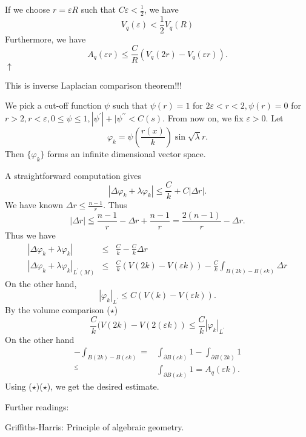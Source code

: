 If we choose $ r = \varepsilon R $ such that $ C \varepsilon < \frac{1}{2}$, we have 
%
\[ V_q (\varepsilon ) < \frac{1}{2} V_q (R) \]
Furthermore, we have 
%
\begin{equation}
A_q (\varepsilon r) \leq \frac{C}{R} (V_q (2r) - V_q (\varepsilon r)). \tag{$\star \star$} \end{equation}
\hspace{1.9in} $\uparrow$  \hfill 

%
This is inverse Laplacian comparison theorem!!!

We pick a cut-off function $ \psi $ such that $ \psi (r) = 1 $ for $ 2 \varepsilon < r < 2 , \psi (r) = 0 $ for $ r > 2 , r < \varepsilon , 0 \leq \psi \leq 1, |\psi ^\prime |+| \psi ^{\prime \prime } < C(s) $. From now on, we fix $ \varepsilon > 0 $. Let 
%
\[ \varphi _k = \psi \left( \frac{r(x)}{k} \right) \sin \sqrt{\lambda} r.\]
%
Then $ \{ \varphi _k\}$ forms an infinite dimensional vector space. 

A straightforward computation gives 
%
\[ |\Delta \varphi _k + \lambda \varphi_k |\leq \frac{C}{k} + C | \Delta r|.\]
%
We have known $ \Delta r \leq \frac{n-1}{r} $. Thus 
%
\[|\Delta r| \leqq \frac{n-1}{r} - \Delta r + \frac{n-1}{r} = \frac{2(n-1)}{r} - \Delta r .\]
Thus we have 
%
\begin{eqnarray*}  |\Delta \varphi _k + \lambda \varphi _k |&\leq& \frac{C}{k} - \frac{C}{k} \Delta r \\
|\Delta \varphi _k + \lambda \varphi _k |_{L^\prime (M)}&\leq& \frac{C}{k}   (V (2k) - V ( \varepsilon k)) - \frac{C}{k} \int_{B(2k) - B (\varepsilon k) }\Delta r \end{eqnarray*}
%
On the other hand, 
%
\[ | \varphi _k |_{L^{\prime}} \leq C ( V(k) - V ( \varepsilon k)) . \]
%
By the volume comparison ($\star$) 
%
\[ \frac{C}{k}( V(2k) - V (2 (\varepsilon k)) \leq \frac{C}{k}|\varphi _k |_{L^{\prime}}\]
On the other hand 
\begin{eqnarray*}
- \int_{B(2k) - B (\varepsilon k) }  = & \int_{\partial B(\varepsilon k)  } 1 - \int_{\partial B(2k)   } 1 \\
^ \leq & \int_{\partial B(\varepsilon k) } 1 = A_q (\varepsilon k) .
\end{eqnarray*}
Using ($\star$)($\star$), we get the desired estimate.



Further readings:

Griffiths-Harris: Principle of algebraic geometry.



